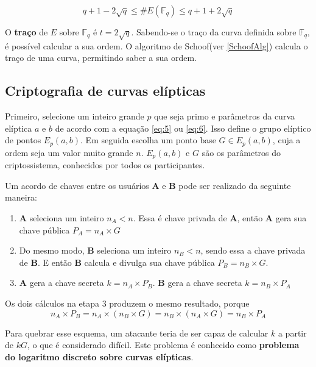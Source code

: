 \begin{equation}
q + 1 - 2\sqrt{q} \leq \#E(\mathbb{F}_q) \leq q + 1 + 2\sqrt{q}
\label{eq:HasseBounds}
\end{equation}

O \textbf{traço} de $E$ sobre $\mathbb{F}_q$ é $t = 2\sqrt{q}$. Sabendo-se o traço da curva definida sobre $\mathbb{F}_q$, é possível calcular a sua ordem. O algoritmo de Schoof(ver \ref{SchoofAlg}) calcula o traço de uma curva, permitindo saber a sua ordem.

%
%
\subsection{Criptografia de curvas elípticas} \label{sec:ecc}
Primeiro, selecione um inteiro grande \(p\) que seja primo e parâmetros da curva elíptica \(a\) e \(b\) de acordo com a equação \ref{eq:5} ou \ref{eq:6}. Isso define o grupo elíptico de pontos $E_p(a, b)$. Em seguida escolha um ponto base $G \in E_p(a, b)$, cuja a ordem seja um valor muito grande \(n\). $E_p(a, b)$ e \(G\) são os parâmetros do criptossistema, conhecidos por todos os participantes.

Um acordo de chaves entre os usuários \textbf{A} e \textbf{B} pode ser realizado da seguinte maneira:
\begin{enumerate}
\item \textbf{A} seleciona um inteiro \(n_A < n\). Essa é chave privada de \textbf{A}, então \textbf{A} gera sua chave pública $P_A = n_A \times G$
\item Do mesmo modo, \textbf{B} seleciona um inteiro \(n_B < n\), sendo essa a chave privada de \textbf{B}. E então \textbf{B} calcula e divulga sua chave pública $P_B = n_B \times G$.
\item \textbf{A} gera a chave secreta $k = n_A \times P_B$. \textbf{B} gera a chave secreta $k = n_B \times P_A$
\end{enumerate}

Os dois cálculos na etapa 3 produzem o mesmo resultado, porque
\begin{equation*}
n_A \times P_B = n_A \times (n_B \times G) = n_B \times (n_A \times G) = n_B \times P_A
\end{equation*}

Para quebrar esse esquema, um atacante teria de ser capaz de calcular \(k\) a partir de \(kG\), o que é considerado difícil. Este problema é conhecido como \textbf{problema do logaritmo discreto sobre curvas elípticas}.
